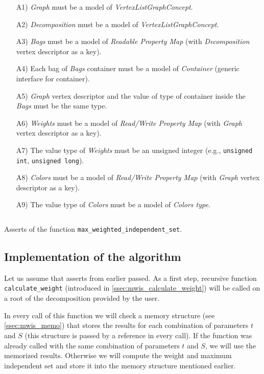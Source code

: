 \documentclass[thesis=B,english]{FITthesis}[2019/03/21]
\begin{document}
\begin{itemize}
	\item[A1)] \emph{Graph} must be a model of \emph{VertexListGraphConcept}.
	\item[A2)] \emph{Decomposition} must be a model of \emph{VertexListGraphConcept}.
	\item[A3)] \emph{Bags} must be a model of \emph{Readable Property Map} (with \emph{Decomposition} vertex descriptor as a key).
	\item[A4)] Each bag of \emph{Bags} container must be a model of \emph{Container} (generic interface for container).
	\item[A5)] \emph{Graph} vertex descriptor and the value of type of container inside the \emph{Bags} must be the same type.
	\item[A6)] \emph{Weights} must be a model of \emph{Read/Write Property Map} (with \emph{Graph} vertex descriptor as a key).
	\item[A7)] The value type of \emph{Weights} must be an unsigned integer (e.g., \texttt{unsigned int}, \texttt{unsigned long}).
	\item[A8)] \emph{Colors} must be a model of \emph{Read/Write Property Map} (with \emph{Graph} vertex descriptor as a key).
	\item[A9)] The value type of \emph{Colors} must be a model of \emph{Colors type}.
\end{itemize}

\begin{listing}[H]
	\inputminted[tabsize=2,breaklines,bgcolor=codebg]{c++}{snippets/mwis_asserts.m}
	\caption[Asserts of the function \texttt{max\_weighted\_independent\_set}]{Asserts of the function \texttt{max\_weighted\_independent\_set}.}
	\label{lst:mwis_asserts}
\end{listing}

\subsection{Implementation of the algorithm}
Let us assume that asserts from earlier passed. As a first step, recursive function \texttt{calculate\_weight} (introduced in \autoref{ssec:mwis_calculate_weight}) will be called on a root of the decomposition provided by the user. 

In every call of this function we will check a memory structure (see \autoref{ssec:mwis_memo}) that stores the results for each combination of parameters $t$ and $S$ (this structure is passed by a reference in every call). If the function was already called with the same combination of parameters $t$ and $S$, we will use the memorized results. Otherwise we will compute the weight and maximum independent set and store it into the memory structure mentioned earlier.
\end{document}
